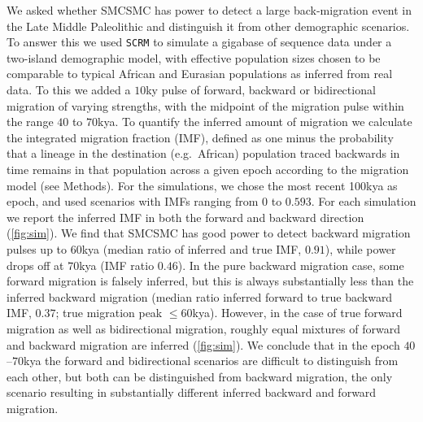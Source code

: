 We asked whether SMCSMC has power to detect a large back-migration event in the Late Middle Paleolithic and distinguish it from other demographic scenarios. To answer this we used {\tt SCRM} \cite{Staab2015} to simulate a gigabase of sequence data under a two-island demographic model,
with effective population sizes chosen to be comparable to typical African and Eurasian populations as inferred from real data. 
To this we added a $10$ky pulse of forward, backward or bidirectional migration of varying strengths, with the midpoint of the migration pulse within the range $40$ to $70$kya.  To quantify the inferred amount of migration we calculate the integrated migration fraction (IMF), defined as one minus the probability that a lineage in the destination (e.g.\ African) population traced backwards in time remains in that population across a given epoch according to the migration model (see Methods).  For the simulations, we chose the most recent 100kya as epoch, and used scenarios with IMFs ranging from $0$ to $0.593$. For each simulation we report the inferred IMF in both the forward and backward direction (\autoref{fig:sim}). We find that SMCSMC has good power to detect backward migration pulses up to $60$kya (median ratio of inferred and true IMF, $0.91$), while power drops off at $70$kya (IMF ratio $0.46$). In the pure backward migration case, some forward migration is falsely inferred, but this is always substantially less than the inferred backward migration (median ratio inferred forward to true backward IMF, $0.37$; true migration peak $\leq 60$kya).  However, in the case of true forward migration as well as bidirectional migration, roughly equal mixtures of forward and backward migration are inferred (\autoref{fig:sim}). We conclude that in the epoch $40$--$70$kya the forward and bidirectional scenarios are difficult to distinguish from each other, but both can be distinguished from backward migration, the only scenario resulting in substantially different inferred backward and forward migration.


